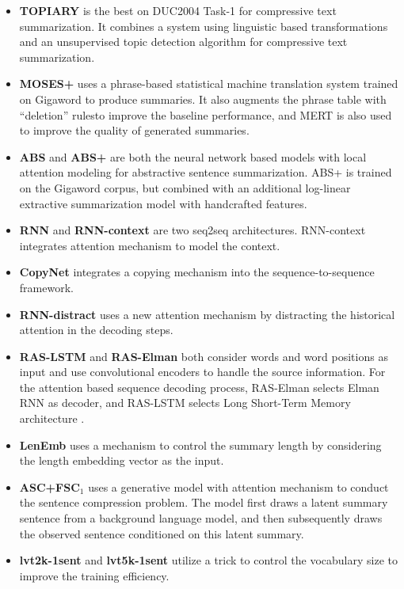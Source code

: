 \documentclass[11pt,letterpaper]{article}
\begin{document}
\begin{itemize}
	
	\item \textbf{TOPIARY} \cite{zajic2004bbn} is the best on DUC2004 Task-1 for compressive text summarization.
	It combines a system using linguistic based transformations and an unsupervised topic detection algorithm for compressive text summarization.
	
	\item \textbf{MOSES+} \cite{rush2015neural} uses a phrase-based statistical machine translation system trained on Gigaword to produce summaries.
	It also augments the phrase table with ``deletion'' rulesto improve the baseline performance, and MERT is also used to improve the quality of generated summaries.
	
	\item \textbf{ABS} and \textbf{ABS+} \cite{rush2015neural} are both the neural network based models with local attention modeling for abstractive sentence summarization.
	ABS+ is trained on the Gigaword corpus, but combined with an additional log-linear extractive summarization model with handcrafted features.
	
	\item \textbf{RNN} and \textbf{RNN-context} \cite{hu2015lcsts} are two seq2seq architectures. RNN-context integrates attention mechanism to model the context.
	
	\item \textbf{CopyNet} \cite{gu2016incorporating} integrates a copying mechanism into the sequence-to-sequence framework.
	
	\item \textbf{RNN-distract} \cite{chen2016distraction} uses a new attention mechanism by distracting the historical attention in the decoding steps.
	
	\item \textbf{RAS-LSTM} and \textbf{RAS-Elman} \cite{chopra2016abstractive} both consider words and word positions as input and use convolutional encoders to handle the source information.
	For the attention based sequence decoding process, RAS-Elman selects Elman RNN \cite{elman1990finding} as decoder, and RAS-LSTM selects Long Short-Term Memory architecture \cite{hochreiter1997long}.
	
	\item \textbf{LenEmb} \cite{kikuchi2016controlling} uses a mechanism to control the summary length by considering the length embedding vector as the input.
	
	\item \textbf{ASC+FSC$_1$} \cite{miao2016language} uses a generative model with attention mechanism to conduct the sentence compression problem.
	The model first draws a latent summary sentence from a background language model, and then subsequently draws the observed sentence conditioned on this latent summary.
	
	\item \textbf{lvt2k-1sent} and \textbf{lvt5k-1sent} \cite{nallapati2016abstractive} utilize a trick to control the vocabulary size to improve the training efficiency.
	
	
\end{itemize}
\end{document}
